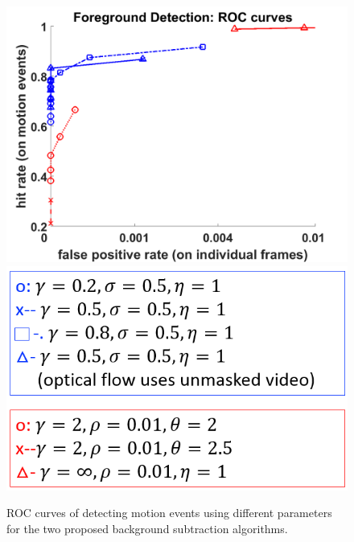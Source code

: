 \documentclass[12pt,oneside]{article} %
\begin{document}
\begin{figure}[htb]
\includegraphics[scale=0.4]{images/roc.png}
\includegraphics[scale=0.4]{images/legend.png}
\caption{ROC curves of detecting motion events using different parameters for the two proposed
background subtraction algorithms.}
\label{roc}
\end{figure}
\end{document}
